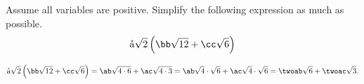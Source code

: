 

\pgfmathtruncatemacro{\ab}{\aa*\bb}
\pgfmathtruncatemacro{\ac}{\aa*\cc}




Assume all variables are positive. Simplify the following expression as much as possible.
\[
 \aa \sqrt{2} \left( \bb \sqrt{12} + \cc \sqrt{6}  \right)
\]

\begin{solution}
\[
 \aa \sqrt{2} \left( \bb \sqrt{12} + \cc \sqrt{6}  \right)
 =\ab\sqrt{4\cdot 6}+\ac \sqrt{4\cdot 3}
 =\ab\sqrt{4}\cdot \sqrt{6}+\ac \sqrt{4}\cdot \sqrt{6}
 =\twoab\sqrt{6}+\twoac\sqrt{3}.
\]

\end{solution}